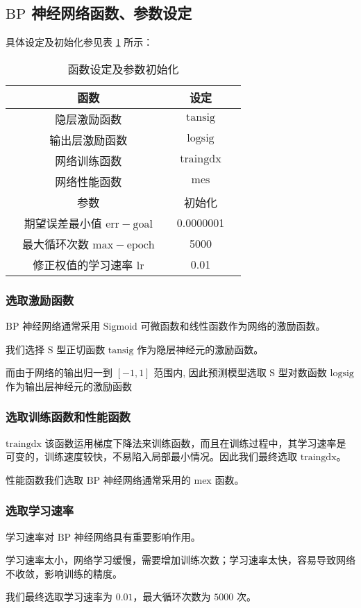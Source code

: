 \subsection{$\mathrm{BP}$ 神经网络函数、参数设定}

  具体设定及初始化参见表 \ref{tab:shedingchushihua} 所示：
  \begin{table}[thb]
    \centering
    \caption{函数设定及参数初始化}
    \begin{tabular*}{0.618\paperwidth}{@{\extracolsep{\fill}}ccccc}
      \toprule[1.5pt]
      &函数 && 设定 &\\
      \midrule[1pt]
      &隐层激励函数 && $\mathrm{tansig}$ &\\
      &输出层激励函数 && $\mathrm{logsig}$ &\\
      &网络训练函数 && $\mathrm{traingdx}$ &\\
      &网络性能函数 && $\mathrm{mes}$ &\\
      \midrule[1pt]
      \midrule[1pt]
      &参数 && 初始化 &\\
      \midrule[1pt]
      &期望误差最小值 $\mathrm{err-goal}$ && 0.0000001 &\\
      &最大循环次数 $\mathrm{max-epoch}$ && 5000 &\\
      &修正权值的学习速率 $\mathrm{lr}$ && 0.01 &\\
      \bottomrule[1.5pt]
    \end{tabular*}
    \label{tab:shedingchushihua}
  \end{table}

  \subsubsection{选取激励函数\cite{Sallybin2013}}

    $\mathrm{BP}$ 神经网络通常采用 $\mathrm{Sigmoid}$ 可微函数和线性函数作为网络的激励函数。

    我们选择 $\mathrm{S}$ 型正切函数 $\mathrm{tansig}$ 作为隐层神经元的激励函数。

    而由于网络的输出归一到 $\left[ -1, 1 \right]$ 范围内, 因此预测模型选取 $\mathrm{S}$ 型对数函数 $\mathrm{logsig}$ 作为输出层神经元的激励函数

  \subsubsection{选取训练函数和性能函数}

    $\mathrm{traingdx}$ 该函数运用梯度下降法来训练函数，而且在训练过程中，其学习速率是可变的，训练速度较快，不易陷入局部最小情况。因此我们最终选取 $\mathrm{traingdx}$。

    性能函数我们选取 $\mathrm{BP}$ 神经网络通常采用的 $\mathrm{mex}$ 函数。

  \subsubsection{选取学习速率\cite{zhangfaming2016}}

    学习速率对 $\mathrm{BP}$ 神经网络具有重要影响作用。

    学习速率太小，网络学习缓慢，需要增加训练次数；学习速率太快，容易导致网络不收敛，影响训练的精度。

    我们最终选取学习速率为 $0.01$，最大循环次数为 $5000$ 次。